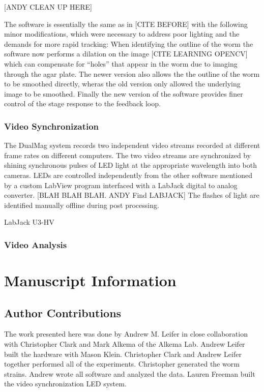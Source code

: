 [ANDY CLEAN UP HERE]


The software is essentially the same as in [CITE BEFORE] with the following minor modifications, which were necessary to address poor lighting and the demands for more rapid tracking: When identifying the outline of the worm the software now performs a dilation on the image [CITE LEARNING OPENCV] which can compensate for ``holes'' that appear in the worm due to imaging through the agar plate. The newer version also allows the the outline of the worm to be smoothed directly, wheras the old version only allowed the underlying image to be smoothed. Finally the new version of the software provides finer control of the stage response to the feedback loop. 




\subsubsection{Video Synchronization}
The DualMag system records two independent video streams recorded at different frame rates on different computers. The two video streams are synchronized by shining synchronous pulses of LED light at the appropriate wavelength into both cameras. LEDs are controlled independently from the other software mentioned by a custom LabView program  interfaced with a LabJack digital to analog converter. [BLAH BLAH BLAH. ANDY Find LABJACK] The flashes of light are identified manually offline during post processing. 

LabJack U3-HV

\subsubsection{Video Analysis}





\section{Manuscript Information}
\subsection{Author Contributions}
The work presented here was done by Andrew M. Leifer in close collaboration with Christopher Clark and Mark Alkema of the Alkema Lab. Andrew Leifer built the hardware with Mason Klein. Christopher Clark and Andrew Leifer together performed all of the experiments. Christopher generated the worm strains. Andrew wrote all software and analyzed the data. Lauren Freeman built the video synchronization LED system. 

